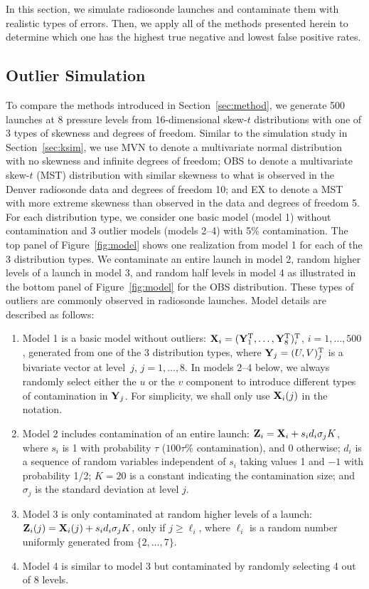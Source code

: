 \documentclass[12pt]{article}
\def\trans{^{\rm T}}
\def\bX{{\bf X}}
\def\bY{{\bf Y}}
\def\bZ{{\bf Z}}
\def\bX{{\bf X}}
\def\bY{{\bf Y}}
\def\bZ{{\bf Z}}
\begin{document}
\begin{doublespacing}
In this section, we  simulate radiosonde launches and contaminate them with realistic types of errors.  Then, we apply all of the methods presented herein to determine which one has the highest true negative and lowest false positive rates.

\subsection{Outlier Simulation}
To compare the methods introduced in Section~\ref{sec:method}, we generate 500 launches at 8 pressure levels from 16-dimensional skew-$t$ distributions
with one of 3 types of skewness and degrees of freedom. Similar to the simulation study in Section~\ref{sec:ksim}, we use MVN to denote a multivariate normal distribution with no skewness and infinite degrees of freedom;
OBS to denote a multivariate skew-$t$ (MST) distribution with similar skewness to what is observed in the Denver radiosonde data and degrees of freedom 10; and EX to denote a MST with more extreme skewness than observed in the data and degrees of freedom 5. For each distribution type, we consider one basic model (model 1) without contamination and 3 outlier models (models 2--4) with 5\% contamination. The top panel of Figure~\ref{fig:model} shows one realization from model 1 for each of the 3 distribution types. We contaminate an entire launch in model 2, random higher levels of a launch in model 3, and random half levels in model 4 as illustrated in the bottom panel of Figure~\ref{fig:model} for the OBS distribution. These types of outliers are commonly observed in radiosonde launches.  Model details are described as follows:

\begin{enumerate}
\item Model 1 is a basic model without outliers: $\bX_i=(\bY_1\trans,\ldots,\bY_8\trans)_i\trans$, $i=1,\ldots, 500$, generated from one of the 3 distribution types, where $\bY_j=(U,V)_j\trans$ is a bivariate vector at level~$j$, $j=1,\ldots,8$. In models 2--4 below, we always randomly select either the $u$ or the $v$ component to introduce different types of contamination in $\bY_j$. For simplicity, we shall only use $\bX_i(j)$ in the notation.
\item Model 2 includes contamination of an entire launch: $\bZ_i=\bX_i+s_id_i\sigma_jK$, where $s_i$ is 1 with probability $\tau$ ($100\tau\%$ contamination), and 0 otherwise; $d_i$ is a sequence of random variables independent of $s_i$ taking values 1 and $-1$ with probability 1/2; $K=20$ is a constant indicating the contamination size; and $\sigma_j$ is the standard deviation at level $j$. 
\item Model 3 is only contaminated at random higher levels of a launch: $\bZ_i(j)=\bX_i(j)+s_id_i\sigma_jK$, only if $j\geq \ell_i$, where $\ell_i$ is a random number uniformly generated from $\{2,\ldots,7\}$.
\item Model 4 is similar to model 3 but contaminated by randomly selecting 4 out of 8 levels.
\end{enumerate}


\end{doublespacing}
\end{document}
